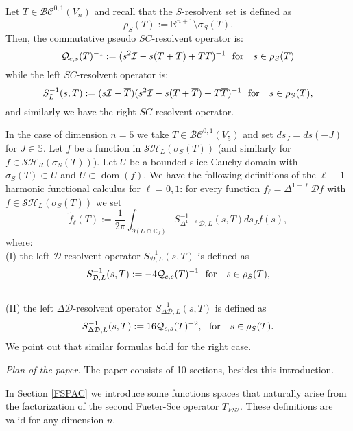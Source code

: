 \documentclass[reqno,11pt]{amsart}
\numberwithin{equation}{section}
\newcommand{\bigD}{\mathcal{D}}
\theoremstyle{definition}
\begin{document}
\medskip
Let $T\in \mathcal {BC}^{0,1}(V_n)$ and
recall that the $S$-resolvent set is defined as
$$
 \rho_S(T):=\mathbb{R}^{n+1}\setminus \sigma_S(T).
$$
Then, the commutative pseudo $SC$-resolvent operator is:
$$
\mathcal Q_{c,s}(T)^{-1}:=(s^2\mathcal I-s(T+\overline T)+T\overline T)^{-1} \ \ {\rm for}\ \ \  s\in \rho_S(T)
$$
while the left $SC$-resolvent operator is:
	$$ S^{-1}_{L}(s,T):=(s\mathcal I-\overline T)(s^2\mathcal I-s(T+\overline T)+T\overline T)^{-1} \ \ {\rm for}\ \ \  s\in \rho_S(T), $$
	and similarly we have the right $SC$-resolvent operator.


\medskip
In the case of dimension $n=5$ we
take $T \in \mathcal{BC}^{0,1}(V_5)$ and set $ds_J=ds(-J)$ for $J \in \mathbb{S}$.
Let $f$ be a function in $\mathcal{SH}_L(\sigma_S(T))$
(and similarly for $f\in\mathcal{SH}_R(\sigma_S(T))$).
Let $U$ be a bounded slice Cauchy domain with $\sigma_S(T)\subset U$ and $\overline U\subset\operatorname{dom}(f)$.
We have the following definitions of the $\ell+1$-harmonic functional calculus for $\ell=0,1$:
	  for every function $\tilde{f}_\ell=\Delta^{1-\ell}\mathcal{D}f$ with $f \in \mathcal{SH}_L(\sigma_S(T))$ we set
		\begin{equation}
			\tilde{f}_\ell(T):=\frac 1{2\pi} \int_{\partial(U \cap \mathbb{C}_J)} S^{-1}_{\Delta^{1-\ell}\bigD,L}(s,T) ds_J f(s),
		\end{equation}
where:
\\
(I)
the left $\mathcal{D}$-resolvent operator $S^{-1}_{\bigD ,L}(s,T)$ is defined as
	\begin{equation}
		S^{-1}_{\bigD ,L}(s,T):=-4 \mathcal{Q}_{c,s}(T)^{-1}  \ \ {\rm for}\ \ \  s\in \rho_S(T),
	\end{equation}
\\
(II)
 the
left $\Delta\bigD$-resolvent operator $S^{-1}_{\Delta \bigD,L}(s,T)$ is defined as
		\begin{equation}
		S^{-1}_{\Delta\bigD ,L}(s,T):=16 \mathcal{Q}_{c,s}(T)^{-2}, \ \ {\rm for}\ \ \  s\in \rho_S(T).
	\end{equation}
	We point out that similar formulas hold for the right case.



\medskip
{\it Plan of the paper.}
The paper consists of 10 sections, besides this introduction.

In Section \ref{FSPAC} we introduce some functions spaces
that naturally arise from the factorization of the second Fueter-Sce operator $T_{FS2}$.
These definitions are valid for any dimension $n$.
\end{document}
